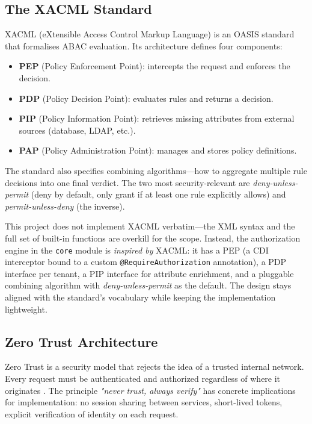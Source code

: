 \subsection{The XACML Standard}

XACML (eXtensible Access Control Markup Language) is an OASIS standard \cite{xacml30} that formalises ABAC evaluation. Its architecture defines four components:

\begin{itemize}
    \item \textbf{PEP} (Policy Enforcement Point): intercepts the request and enforces the decision.
    \item \textbf{PDP} (Policy Decision Point): evaluates rules and returns a decision.
    \item \textbf{PIP} (Policy Information Point): retrieves missing attributes from external sources (database, LDAP, etc.).
    \item \textbf{PAP} (Policy Administration Point): manages and stores policy definitions.
\end{itemize}

The standard also specifies combining algorithms—how to aggregate multiple rule decisions into one final verdict. The two most security-relevant are \textit{deny-unless-permit} (deny by default, only grant if at least one rule explicitly allows) and \textit{permit-unless-deny} (the inverse).

This project does not implement XACML verbatim—the XML syntax and the full set of built-in functions are overkill for the scope. Instead, the authorization engine in the \texttt{core} module is \textit{inspired by} XACML: it has a PEP (a CDI interceptor bound to a custom \texttt{@RequireAuthorization} annotation), a PDP interface per tenant, a PIP interface for attribute enrichment, and a pluggable combining algorithm with \textit{deny-unless-permit} as the default. The design stays aligned with the standard's vocabulary while keeping the implementation lightweight.

\subsection{Zero Trust Architecture}

Zero Trust is a security model that rejects the idea of a trusted internal network. Every request must be authenticated and authorized regardless of where it originates \cite{nist_zerotrust}. The principle \textit{"never trust, always verify"} has concrete implications for implementation: no session sharing between services, short-lived tokens, explicit verification of identity on each request.


